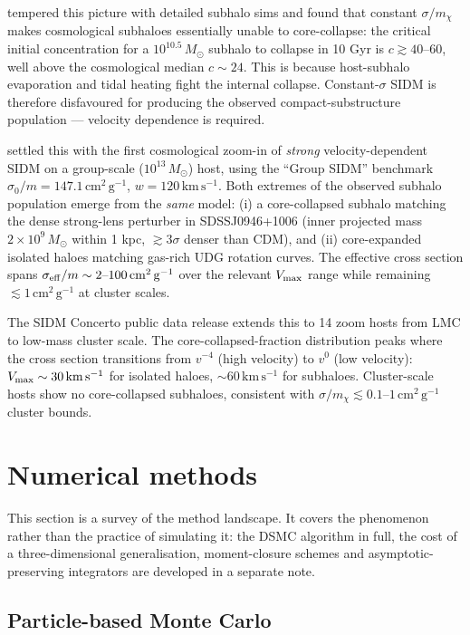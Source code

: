 \documentclass[12pt]{article}
\newcommand{\cmg}{\,\mathrm{cm^2\,g^{-1}}}
\newcommand{\kms}{\,\mathrm{km\,s^{-1}}}
\newcommand{\Msun}{\,M_\odot}
\newcommand{\smx}{\sigma/m_\chi}
\begin{document}
\citet{Zeng2022} tempered this picture with detailed subhalo sims and
found that constant $\smx$ makes cosmological subhaloes essentially
unable to core-collapse: the critical initial concentration for a
$10^{10.5}\Msun$ subhalo to collapse in 10 Gyr is
$c\gtrsim 40\text{--}60$, well above the cosmological median $c\sim
24$.  This is because host-subhalo evaporation and tidal heating fight
the internal collapse.  Constant-$\sigma$ SIDM is therefore
disfavoured for producing the observed compact-substructure population
--- velocity dependence is required.

\citet{Nadler2023} settled this with the first cosmological zoom-in
of \emph{strong} velocity-dependent SIDM on a group-scale
($10^{13}\Msun$) host, using the ``Group SIDM'' benchmark
$\sigma_0/m = 147.1\cmg$, $w = 120\kms$.  Both extremes of the
observed subhalo population emerge from the \emph{same} model: (i) a
core-collapsed subhalo matching the dense strong-lens perturber in
SDSSJ0946+1006 (inner projected mass $2\times 10^9\Msun$ within 1 kpc,
$\gtrsim 3\sigma$ denser than CDM), and (ii) core-expanded
isolated haloes matching gas-rich UDG rotation curves.  The effective
cross section spans $\sigma_{\rm eff}/m \sim 2\text{--}100\cmg$ over
the relevant $V_{\rm max}$ range while remaining $\lesssim 1\cmg$ at
cluster scales.

The \citet{Palubski2025} SIDM Concerto public data release
extends this to 14 zoom hosts from LMC to low-mass cluster scale.  The
core-collapsed-fraction distribution peaks where the cross section
transitions from $v^{-4}$ (high velocity) to $v^0$ (low velocity):
$V_{\rm max}\sim 30\kms$ for isolated haloes, $\sim 60\kms$ for
subhaloes.  Cluster-scale hosts show no core-collapsed subhaloes,
consistent with $\smx\lesssim 0.1$--$1\cmg$ cluster bounds.

\section{Numerical methods}
\label{sec:numerical}

This section is a survey of the method landscape.  It covers the
phenomenon rather than the practice of simulating it: the DSMC
algorithm in full, the cost of a three-dimensional generalisation,
moment-closure schemes and asymptotic-preserving integrators are
developed in a separate note.

\subsection{Particle-based Monte Carlo}
\end{document}
